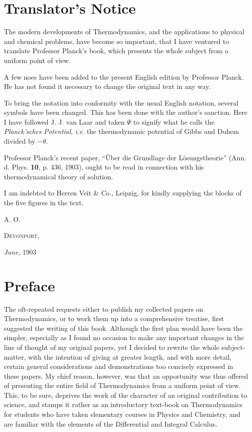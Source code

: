 \documentclass[oneside,12pt]{book}
\newcommand{\iit}[1]{\textit{#1}}
\begin{document}
\chapter{Translator's Notice}
The modern developments of Thermodynamics, and the applications to physical and chemical problems, have become so important, that I have ventured to translate Professor Planck's book, which presents the whole subject from a uniform point of view. \par

A few noes have been added to the present English edition by Professor Planck. He has not found it necessary to change the original text in any way. \par

To bring the notation into conformity with the usual English notation, several symbols have been changed. This has been done with the author's sanction. Here I have followed J. J. van Laar and taken $\Psi$ to signify what he calls the \iit{Planck'sches Potential}, \iit{i.e.} the thermodynamic potential of Gibbs and Duhem divided by $-\theta$. \par

Professor Planck's recent paper, ``\"Uber die Grundlage der L\"osungstheorie'' (Ann. d. Phys. \textbf{10}, p. 436, 1903), ought to be read in connection with his thermodynamical theory of solution. \par

I am indebted to Herren Veit \& Co., Leipzig, for kindly supplying the blocks of the five figures in the text. \par

\begin{flushright}
    A. O.
\end{flushright}
\textsc{Devonport,} \par
\textit{June,} 1903

\chapter{Preface}
The oft-repeated requests either to publish my collected papers on Thermodynamics, or to work them up into a comprehensive treatise, first suggested the writing of this book. Although the first plan would have been the simpler, especially as I found no occasion to make any important changes in the line of thought of my original papers, yet I decided to rewrite the whole subject-matter, with the intention of giving at greater length, and with more detail, certain general considerations and demonstrations too concisely expressed in these papers. My chief reason, however, was that an opportunity was thus offered of presenting the entire field of Thermodynamics from a uniform point of view. This, to be sure, deprives the work of the character of an original contribution to science, and stamps it rather as an introductory text-book on Thermodynamics for students who have taken elementary courses in Physics and Chemistry, and are familiar with the elements of the Differential and Integral Calculus. \par
\end{document}
